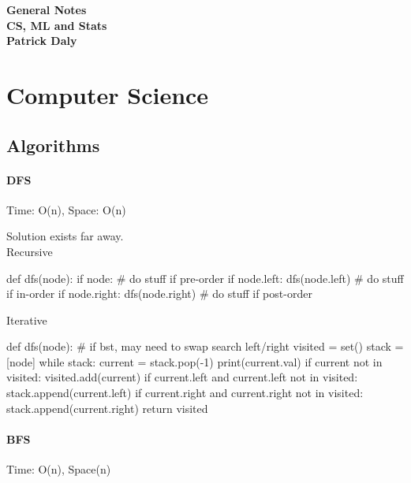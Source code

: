 \documentclass[11pt]{article}
\begin{document}
\begin{center}
  \vspace*{10mm}
  {\bfseries {\huge General Notes}}\\
  \vspace*{5mm}
  {\bfseries {CS, ML and Stats}
    \\ \vspace*{2mm} {\large Patrick Daly}
  }
\end{center}

\newpage

\tableofcontents
\newpage

\section{Computer Science}

\subsection{Algorithms}

\paragraph{DFS}  Time: O(n), Space: O(n)

Solution exists far away.\\

Recursive
\begin{python}
def dfs(node):
  if node:
    # do stuff if pre-order
    if node.left:
      dfs(node.left)
    # do stuff if in-order
    if node.right:
      dfs(node.right)
    # do stuff if post-order
\end{python}

Iterative
\begin{python}
def dfs(node): # if bst, may need to swap search left/right
    visited = set()
    stack = [node]
    while stack:
        current = stack.pop(-1)
        print(current.val)
        if current not in visited:
            visited.add(current)
        if current.left and current.left not in visited:
            stack.append(current.left)
        if current.right and current.right not in visited:
            stack.append(current.right)
    return visited
\end{python}

\paragraph{BFS} Time: O(n), Space(n)
\end{document}
